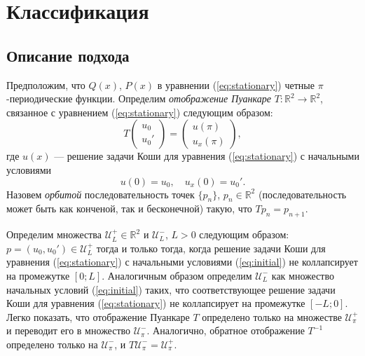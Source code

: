 \chapter{Классификация}

\section{Описание подхода}

Предположим, что $Q(x)$, $P(x)$ в уравнении (\ref{eq:stationary}) четные $\pi$-периодические функции.
Определим {\it отображение Пуанкаре} $T: \mathbb{R}^2 \to \mathbb{R}^2$, связанное с уравнением (\ref{eq:stationary}) следующим образом:
%
\begin{equation}
T
\begin{pmatrix}
u_0 \\
u_0'
\end{pmatrix}
=
\begin{pmatrix}
u(\pi) \\
u_x(\pi)
\end{pmatrix},
\end{equation}
%
где $u(x)$ --- решение задачи Коши для уравнения (\ref{eq:stationary}) с начальными условиями
%
\begin{equation}
u(0) = u_0, \quad u_x(0) = u_0'.
\label{eq:initial}
\end{equation}
%
Назовем {\it орбитой} последовательность точек $\{ p_n \}$, $p_n \in \mathbb{R}^2$ (последовательность может быть как конченой, так и бесконечной) такую, что $Tp_n = p_{n+1}$.

Определим множества $\mathcal{U}_L^+ \in \mathbb{R}^2$ и $\mathcal{U}_L^-$, $L > 0$ следующим образом: $p = (u_0, u_0') \in \mathcal{U}_L^+$ тогда и только тогда, когда решение задачи Коши для уравнения (\ref{eq:stationary}) с начальными условиями (\ref{eq:initial}) не коллапсирует на промежутке $[0;L]$.
Аналогичным образом определим $\mathcal{U}_L^-$ как множество начальных условий (\ref{eq:initial}) таких, что соответствующее решение задачи Коши для уравнения (\ref{eq:stationary}) не коллапсирует на промежутке $[-L;0]$.
Легко показать, что отображение Пуанкаре $T$ определено только на множестве $\mathcal{U}_{\pi}^+$ и переводит его в множество $\mathcal{U}_{\pi}^-$.
Аналогично, обратное отображение $T^{-1}$ определено только на $\mathcal{U}_{\pi}^-$, и $T \mathcal{U}_{\pi}^- = \mathcal{U}_{\pi}^+$.

